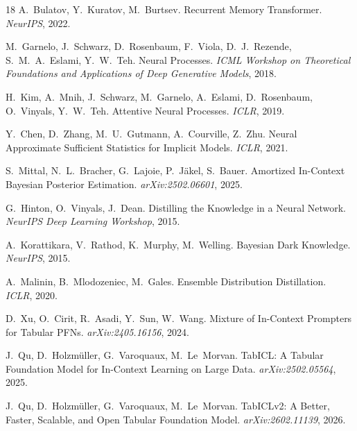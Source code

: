 \documentclass{article}
\begin{document}
\begin{thebibliography}{18}
A.~Bulatov, Y.~Kuratov, M.~Burtsev.
\newblock Recurrent Memory Transformer.
\newblock \emph{NeurIPS}, 2022.

M.~Garnelo, J.~Schwarz, D.~Rosenbaum, F.~Viola, D.~J.~Rezende,
S.~M.~A.~Eslami, Y.~W.~Teh.
\newblock Neural Processes.
\newblock \emph{ICML Workshop on Theoretical Foundations and Applications of
Deep Generative Models}, 2018.

H.~Kim, A.~Mnih, J.~Schwarz, M.~Garnelo, A.~Eslami, D.~Rosenbaum,
O.~Vinyals, Y.~W.~Teh.
\newblock Attentive Neural Processes.
\newblock \emph{ICLR}, 2019.

Y.~Chen, D.~Zhang, M.~U.~Gutmann, A.~Courville, Z.~Zhu.
\newblock Neural Approximate Sufficient Statistics for Implicit Models.
\newblock \emph{ICLR}, 2021.

S.~Mittal, N.~L.~Bracher, G.~Lajoie, P.~J\"akel, S.~Bauer.
\newblock Amortized In-Context Bayesian Posterior Estimation.
\newblock \emph{arXiv:2502.06601}, 2025.

G.~Hinton, O.~Vinyals, J.~Dean.
\newblock Distilling the Knowledge in a Neural Network.
\newblock \emph{NeurIPS Deep Learning Workshop}, 2015.

A.~Korattikara, V.~Rathod, K.~Murphy, M.~Welling.
\newblock Bayesian Dark Knowledge.
\newblock \emph{NeurIPS}, 2015.

A.~Malinin, B.~Mlodozeniec, M.~Gales.
\newblock Ensemble Distribution Distillation.
\newblock \emph{ICLR}, 2020.

D.~Xu, O.~Cirit, R.~Asadi, Y.~Sun, W.~Wang.
\newblock Mixture of In-Context Prompters for Tabular PFNs.
\newblock \emph{arXiv:2405.16156}, 2024.

J.~Qu, D.~Holzm\"uller, G.~Varoquaux, M.~Le~Morvan.
\newblock TabICL: A Tabular Foundation Model for In-Context Learning on
Large Data.
\newblock \emph{arXiv:2502.05564}, 2025.

J.~Qu, D.~Holzm\"uller, G.~Varoquaux, M.~Le~Morvan.
\newblock TabICLv2: A Better, Faster, Scalable, and Open Tabular Foundation
Model.
\newblock \emph{arXiv:2602.11139}, 2026.


\end{thebibliography}
\end{document}

